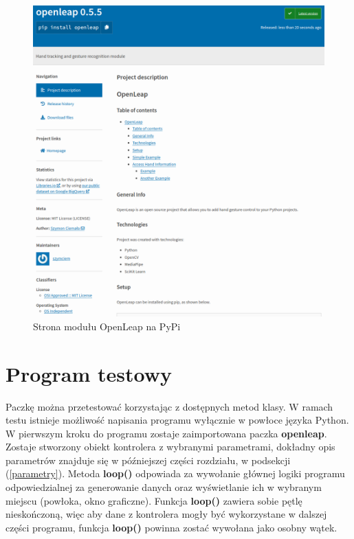 \begin{figure}[H]
    \begin{center}
        \includegraphics[width=15cm]{../images/pypi_page.png}
        \caption{Strona modułu OpenLeap na PyPi}
    \end{center}
\end{figure}

\section{Program testowy}

\quad Paczkę można przetestować korzystając z dostępnych metod klasy. W ramach testu istnieje możliwość napisania programu wyłącznie w powłoce języka Python. W pierwszym kroku do programu zostaje zaimportowana paczka \textbf{openleap}. Zostaje stworzony obiekt kontrolera z wybranymi parametrami, dokładny opis parametrów znajduje się w późniejszej części rozdziału, w podsekcji (\ref{parametry}). Metoda \textbf{loop()} odpowiada za wywołanie głównej logiki programu odpowiedzialnej za generowanie danych oraz wyświetlanie ich w wybranym miejscu (powłoka, okno graficzne). Funkcja \textbf{loop()} zawiera sobie pętlę nieskończoną, więc aby dane z kontrolera mogły być wykorzystane w dalszej części programu, funkcja \textbf{loop()} powinna zostać wywołana jako osobny wątek.\newline

